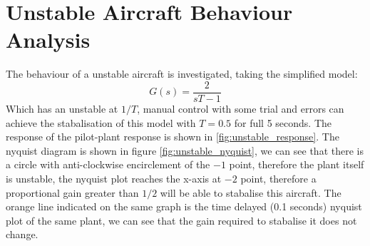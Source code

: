 \documentclass{article}
\begin{document}
\section{Unstable Aircraft Behaviour Analysis}
The behaviour of a unstable aircraft is investigated, taking the simplified model:
\begin{equation}
	G(s)=\dfrac{2}{sT-1}
\end{equation}
Which has an unstable at $1/T$, manual control with some trial and errors can achieve the stabalisation of this model with $T=0.5$ for full 5 seconds. The response of the pilot-plant response is shown in \ref{fig:unstable_response}. The nyquist diagram is shown in figure \ref{fig:unstable_nyquist}, we can see that there is a circle with anti-clockwise encirclement of the $-1$ point, therefore the plant itself is unstable, the nyquist plot reaches the x-axis at $-2$ point, therefore a proportional gain greater than $1/2$ will be able to stabalise this aircraft. The orange line indicated on the same graph is the time delayed (0.1 seconds) nyquist plot of the same plant, we can see that the gain required to stabalise it does not change.
\end{document}
